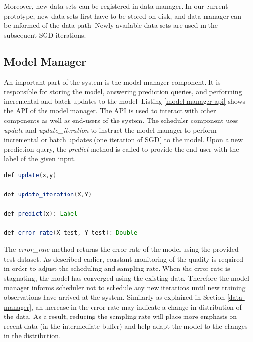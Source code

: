 \documentclass{vldb}
\begin{document}
Moreover,  new data sets can be registered in data manager.
In our current prototype, new data sets first have to be stored on disk, and data manager can be informed of the data path.
Newly available data sets are used in the subsequent SGD iterations.

\subsection{Model Manager} \label{model-manager} 
An important part of the system is the model manager component.
It is responsible for storing the model, answering prediction queries, and performing incremental and batch updates to the model.
Listing \ref{model-manager-api} shows the API of the model manager.
The API is used to interact with other components as well as end-users of the system.
The scheduler component uses \textit{update} and \textit{update\_iteration} to instruct the model manager to perform incremental or batch updates (one iteration of SGD) to the model.
Upon a new prediction query, the \textit{predict} method is called to provide the end-user with the label of the given input.

\noindent\begin{minipage}[t]{\linewidth}
\begin{lstlisting}[language=java, basicstyle=\small\ttfamily, frame=tb ,columns=fullflexible,
showstringspaces=false,label=model-manager-api,caption=Model Manager API, numberstyle=\tiny]
def update(x,y)

def update_iteration(X,Y)

def predict(x): Label

def error_rate(X_test, Y_test): Double

\end{lstlisting}
\end{minipage}


The \textit{error\_rate} method returns the error rate of the model using the provided test dataset.
As described earlier, constant monitoring of the quality is required in order to adjust the scheduling and sampling rate.
When the error rate is stagnating, the model has converged using the existing data.
Therefore the model manager informs scheduler not to schedule any new iterations until new training observations have arrived at the system.
Similarly as explained in Section \ref{data-manager}, an increase in the error rate may indicate a change in distribution of the data.
As a result, reducing the sampling rate will place more emphasis on recent data (in the intermediate buffer) and help adapt the model to the changes in the distribution.
\end{document}
